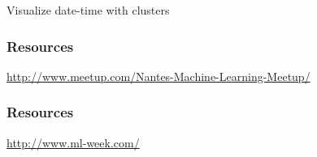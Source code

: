 \begin{frame}
\end{frame}

\begin{frame}
\end{frame}

\begin{frame}
\end{frame}

\begin{frame}
\end{frame}

\begin{frame}
\end{frame}

\begin{frame}
  Visualize date-time with clusters
\end{frame}


\begin{frame}
  \frametitle{Resources}

  \vspace{5mm}
  \centerline{\url{http://www.meetup.com/Nantes-Machine-Learning-Meetup/}}
\end{frame}

\begin{frame}
  \frametitle{Resources}

  \vspace{5mm}
  \centerline{\url{http://www.ml-week.com/}}
\end{frame}

\begin{frame}
\end{frame}


